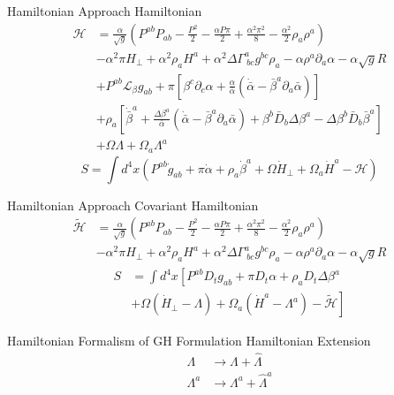 \documentclass[xcolor=dvipsnames]{beamer}
\begin{document}
	\begin{frame}{Hamiltonian Approach}
		Hamiltonian
		\begin{align*}
		\mathscr{H} &= \frac{\alpha}{\sqrt{g}}\left(P^{ab}P_{ab} - \frac{P^{2}}{2} - \frac{\alpha P \pi}{2} + \frac{\alpha^{2}\pi^{2}}{8} - \frac{\alpha^{2}}{2}\rho_{a}\rho^{a}\right)\\
		& -\alpha^{2}\pi H_{\perp} + \alpha^{2}\rho_{a}H^{a} + \alpha^{2}\Delta\Gamma^{a}_{~bc}g^{bc}\rho_{a} - \alpha \rho^{a}\partial_{a}\alpha - \alpha\sqrt{g}R\\
		& + P^{ab} \mathcal{L}_{\beta}g_{ab} + \pi \left[\beta^{c}\partial_{c}\alpha + \frac{\alpha}{{\bar \alpha}}\left({\dot {\bar \alpha}} - {\bar \beta}^{a}\partial_{a}{\bar \alpha}\right)\right]\\
		& + \rho_{a}\left[{\dot {\bar \beta}}^{a} + \frac{\Delta \beta^{a}}{{\bar \alpha}}\left({\dot {\bar \alpha}} - {\bar \beta}^{a}\partial_{a}{\bar \alpha}\right) + \beta^{b}{\bar D}_{b}\Delta \beta^{a} - \Delta \beta^{b} {\bar D}_{b}{\bar \beta}^{a}\right]\\
		& + \Omega \Lambda + \Omega_{a}\Lambda^{a}
		\end{align*}
		\[
			S =\int d^{4}x \left(P^{ab}{\dot g}_{ab} + \pi {\dot \alpha} + \rho_{a}{\dot \beta}^{a} + \Omega{\dot H_{\perp}} + \Omega_{a}{\dot H}^{a} - \mathscr{H}\right)
		\]
	\end{frame}
	\begin{frame}{Hamiltonian Approach}
		Covariant Hamiltonian
		\begin{align*}
		\tilde{\mathscr{H}} & = \frac{\alpha}{\sqrt{g}}\left(P^{ab}P_{ab} - \frac{P^{2}}{2} - \frac{\alpha P \pi}{2} + \frac{\alpha^{2}\pi^{2}}{8} - \frac{\alpha^{2}}{2}\rho_{a}\rho^{a}\right)\\
		& -\alpha^{2}\pi H_{\perp} + \alpha^{2}\rho_{a}H^{a} + \alpha^{2}\Delta\Gamma^{a}_{~bc}g^{bc}\rho_{a} - \alpha \rho^{a}\partial_{a}\alpha - \alpha\sqrt{g}R
		\end{align*}
		\begin{align*}
		S &= \int d^{4}x \left[ P^{ab}D_{t}g_{ab} + \pi D_{t}\alpha + \rho_{a}D_{t}\Delta\beta^{a}\right. \\
		& \left. + \Omega \left({\dot H}_{\perp} - \Lambda\right) + \Omega_{a}\left({\dot H}^{a} - \Lambda^{a}\right) - \tilde{\mathscr{H}}\right]
		\end{align*}
	\end{frame}
	\begin{frame}{Hamiltonian Formalism of GH Formulation}
		Hamiltonian Extension
		\begin{align*}
			\Lambda &\rightarrow \Lambda + {\hat \Lambda}\\
			\Lambda^{a} &\rightarrow \Lambda^{a} + {\hat \Lambda}^{a}
		\end{align*}
	\end{frame}
\end{document}
